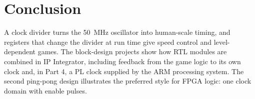 \section{Conclusion}
A clock divider turns the \SI{50}{MHz} oscillator into human-scale timing, and registers that change the
divider at run time give speed control and level-dependent games. The block-design projects show how RTL
modules are combined in IP Integrator, including feedback from the game logic to its own clock and, in
Part 4, a PL clock supplied by the ARM processing system. The second ping-pong design illustrates the
preferred style for FPGA logic: one clock domain with enable pulses.


